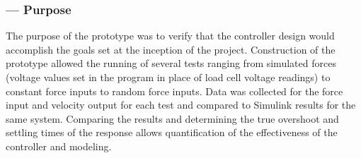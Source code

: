 \subsubsection*{ --- Purpose}
The purpose of the prototype was to verify that the controller design would accomplish the goals set at the inception of the project. Construction of the prototype allowed the running of several tests ranging from simulated forces (voltage values set in the program in place of load cell voltage readings) to constant force inputs to random force inputs. Data was collected for the force input and velocity output for each test and compared to Simulink results for the same system. Comparing the results and determining the true overshoot and settling times of the response allows quantification of the effectiveness of the controller and modeling.